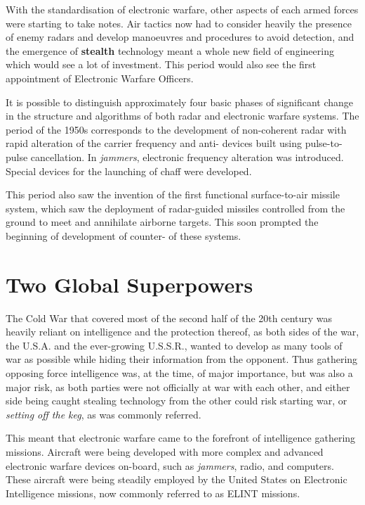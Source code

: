 \documentclass[english,purist]{ist-report}
\begin{document}
With the standardisation of electronic warfare, other aspects of each armed forces were starting to take notes. Air tactics now had to consider heavily the presence of enemy radars and develop manoeuvres and procedures to avoid detection, and the emergence of \textbf{stealth} technology meant a whole new field of engineering which would see a lot of investment. This period would also see the first appointment of Electronic Warfare Officers.

It is possible to distinguish approximately four basic phases of significant change in the structure and algorithms of both radar and electronic warfare systems. The period of the 1950s corresponds to the development of non-coherent radar with rapid alteration of the carrier frequency and anti-\jamming{} devices built using pulse-to-pulse cancellation. In \textit{jammers}, electronic frequency alteration was introduced. Special devices for the launching of chaff were developed.

This period also saw the invention of the first functional surface-to-air missile system, which saw the deployment of radar-guided missiles controlled from the ground to meet and annihilate airborne targets. This soon prompted the beginning of development of counter-\jamming{} of these systems.

\section{Two Global Superpowers}

The Cold War that covered most of the second half of the 20th century was heavily reliant on intelligence and the protection thereof, as both sides of the war, the U.S.A. and the ever-growing U.S.S.R., wanted to develop as many tools of war as possible while hiding their information from the opponent. Thus gathering opposing force intelligence was, at the time, of major importance, but was also a major risk, as both parties were not officially at war with each other, and either side being caught stealing technology from the other could risk starting war, or \textit{setting off the keg}, as was commonly referred.

This meant that electronic warfare came to the forefront of intelligence gathering missions. Aircraft were being developed with more complex and advanced electronic warfare devices on-board, such as \textit{jammers}, radio, and computers. These aircraft were being steadily employed by the United States on Electronic Intelligence missions, now commonly referred to as ELINT missions.
\end{document}

